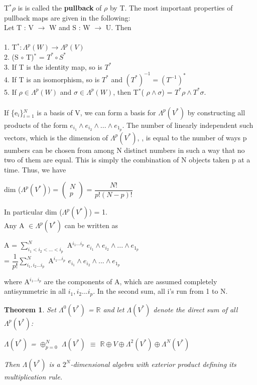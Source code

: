 \documentclass[12pt,a4paper]{article}
\newtheorem{thm}{Theorem}
\begin{document}
T$^*\rho$ is is called the \textbf{pullback } of $\rho$ by T. The most important properties of
pullback maps are given in the following:\\
Let T : V $\to$ W and  S : W $\to$ U. Then\\
\\
1. T$^* : \Lambda^{p} (W) \to \Lambda^{p} (V)$\\
2. (S $\circ$ T)$^*$ = $T^* \circ S^*$\\
3. If T is the identity map, so is $T^*$\\
4. If T is an isomorphism, so is $T^*$ and $(T^*)^{-1} = (T^{-1})^*$\\
5. If $\rho \in \Lambda^{p} (W)$ and $\sigma \in \Lambda^{p} (W)$, then T$^*$( $\rho \wedge \sigma $) = $T^* \rho \wedge T^* \sigma$.
\\ \\
If \{e$_i$\}$^N_{i=1}$ is a basis of V, we can form a basis for $\Lambda^{p}(V^*)$ by constructing all products of the form $e_{i_1} \wedge e_{i_2} \wedge ... \wedge e_{1_p}$.  The number of linearly independent such vectors, which is the dimension of  $\Lambda^{p}(V^*)$,  , is equal to the number
of ways p numbers can be chosen from among N distinct numbers in such
a way that no two of them are equal. This is simply the combination of N
objects taken p at a time. Thus, we have \\
\begin{center}
 dim ($\Lambda^{p}(V^*)$) =  $\begin{pmatrix} N \\ p \end{pmatrix}$ =  $\dfrac{N!}{p!(N - p)!}$
\end{center}

In particular dim ($\Lambda^{p}(V^*)$) = 1.\\
\indent Any A $\in \Lambda^{p}(V^*)$ can be written as 
\begin{center}
A = $\sum^{N}_{i_1 < i_2 < ... < i_p}$ A$^{i_1...i_p}$  $e_{i_1} \wedge e_{i_2} \wedge ... \wedge e_{1_p}$ \\
= $\dfrac{1}{p!} \sum^{N}_{i_1,i_2 ... i_p}$ A$^{i_1...i_p}$  $e_{i_1} \wedge e_{i_2} \wedge ... \wedge e_{1_p}$
\end{center}
where A$^{i_1...i_p}$ are the components of A, which are assumed completely antisymmetric in all $i_1,i_2 ... i_p$. In the second sum, all i’s run from 1 to N.\\
\begin{thm}
Set $\Lambda^{0}(V^*)$ = $\mathbb{R}$ and let $\Lambda(V^*)$ denote the direct
sum of all  $\Lambda^{p}(V^*)$:
\begin{center}
$\Lambda(V^*)$  = $\oplus^{N}_{p = 0}$  $\Lambda(V^*)$ $\equiv$ $\mathbb{R} \oplus V \oplus \Lambda^{2}(V^*) \oplus \Lambda^{N}(V^*)$
\end{center}
Then $\Lambda(V^*)$ is a $2^N$-dimensional algebra with exterior product defining its multiplication rule.	
\end{thm}
\end{document}
